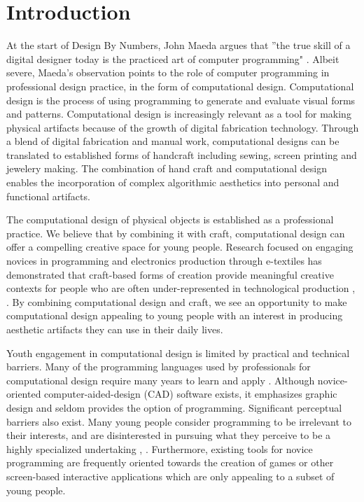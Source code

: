 \documentclass{sigchi}
\begin{document}

\section{Introduction}
At the start of Design By Numbers, John Maeda argues that ''the true skill of a digital designer today is the practiced art of computer programming" \cite{maeda}. Albeit severe, Maeda's observation points to the role of computer programming in professional design practice, in the form of computational design. Computational design is the process of using programming to generate and evaluate visual forms and patterns. Computational design is increasingly relevant as a tool for making physical artifacts because of the growth of digital fabrication technology. Through a blend of digital fabrication and manual work, computational designs can be translated to established forms of handcraft including sewing, screen printing and jewelery making. The combination of hand craft and computational design enables the incorporation of complex algorithmic aesthetics into personal and functional artifacts.

The computational design of physical objects is established as a professional practice. We believe that by combining it with craft, computational design can offer a compelling creative space for young people. Research focused on engaging novices in programming and electronics production through e-textiles has demonstrated that craft-based forms of creation provide meaningful creative contexts for people who are often under-represented in technological production \cite{lilypad}, \cite{kafai}. By combining computational design and craft, we see an opportunity to make computational design appealing to young people with an interest in producing aesthetic artifacts they can use in their daily lives.

Youth engagement in computational design is limited by practical and technical barriers. Many of the programming languages used by professionals for computational design require many years to learn and apply \cite{reas}. Although novice-oriented computer-aided-design (CAD) software exists, it emphasizes graphic design and seldom provides the option of programming. Significant perceptual barriers also exist. Many young people consider programming to be irrelevant to their interests, and are disinterested in pursuing what they perceive to be a highly specialized undertaking \cite{resnick1}, \cite{introductory_programming}. Furthermore, existing tools for novice programming are frequently oriented towards the creation of games or other screen-based interactive applications which are only appealing to a subset of young people.
\end{document}
